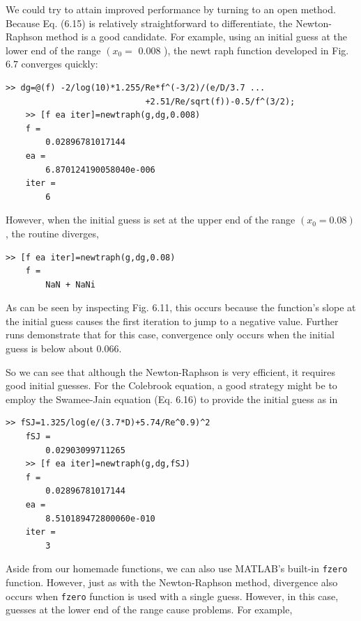 \documentclass[../main.tex]{subfiles}
\begin{document}
We could try to attain improved performance by turning to an open method. Because Eq. (6.15) is relatively straightforward to differentiate, the Newton-Raphson method is a good candidate. For example, using an initial guess at the lower end of the range $\left(x_{0}=\right.$ $0.008$ ), the newt raph function developed in Fig. $6.7$ converges quickly:

\begin{lstlisting}[numbers=none,frame=none,xleftmargin=-\leftmargini]
    >> dg=@(f) -2/log(10)*1.255/Re*f^(-3/2)/(e/D/3.7 ...
                            +2.51/Re/sqrt(f))-0.5/f^(3/2);
    >> [f ea iter]=newtraph(g,dg,0.008)
    f =
        0.02896781017144
    ea =
        6.870124190058040e-006
    iter =
        6
\end{lstlisting}

\noindent However, when the initial guess is set at the upper end of the range $\left(x_{0}=0.08\right)$, the routine diverges,

\begin{lstlisting}[numbers=none,frame=none,xleftmargin=-\leftmargini]
    >> [f ea iter]=newtraph(g,dg,0.08)
    f =
        NaN + NaNi
\end{lstlisting}

\noindent As can be seen by inspecting Fig. 6.11, this occurs because the function's slope at the initial guess causes the first iteration to jump to a negative value. Further runs demonstrate that for this case, convergence only occurs when the initial guess is below about $0.066$.

So we can see that although the Newton-Raphson is very efficient, it requires good initial guesses. For the Colebrook equation, a good strategy might be to employ the Swamee-Jain equation (Eq. 6.16) to provide the initial guess as in

\begin{lstlisting}[numbers=none,frame=none,xleftmargin=-\leftmargini]
    >> fSJ=1.325/log(e/(3.7*D)+5.74/Re^0.9)^2
    fSJ =
        0.02903099711265
    >> [f ea iter]=newtraph(g,dg,fSJ)
    f =
        0.02896781017144
    ea =
        8.510189472800060e-010
    iter =
        3
\end{lstlisting}

Aside from our homemade functions, we can also use MATLAB's built-in \texttt{fzero}
function. However, just as with the Newton-Raphson method, divergence also occurs when
\texttt{fzero} function is used with a single guess. However, in this case, guesses at the lower end
of the range cause problems. For example,
\end{document}
